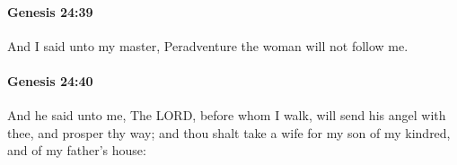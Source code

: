 		\paragraph{Genesis 24:39} %
			\label{GENESIS-24-39}

			And I said unto my master, Peradventure the woman will not follow me.


		\paragraph{Genesis 24:40} %
			\label{GENESIS-24-40}

			And he said unto me, The LORD, before whom I walk, will send his angel with thee, and prosper thy way; and thou shalt take a wife for my son of my kindred, and of my father's house:


